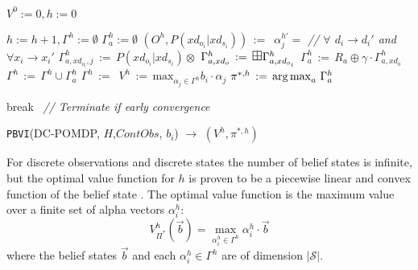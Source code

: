 \documentclass{article} %
\def\argmax{\operatornamewithlimits{arg\max}}
\begin{document}
\begin{algorithm}[t!]
\vspace{-.5mm}
\dontprintsemicolon
{}
\Begin
{
   $V^0:=0, h:=0$\;
   {
       $h:=h+1, \Gamma^h :=\emptyset$\;
       {
			$\Gamma_{a}^h :=\emptyset$ \;       		
       			{$(O^h,P(xd_{o_i}|xd_{s_i})) \,:=\,$ \;}
       		 {
       			{
   	 		  		$\alpha_j^{h'}=$  
   	 		  		\emph{// $\forall$ $d_i \to d_i'$ and $\forall x_i \to x_i'$} \; 
   	 		    	$\Gamma_{a,xd_{o_i},j}^h \,:=\, P(xd_{o_i}|xd_{s_i}) \otimes$ \;
       	      	}
       	      	$\Gamma_{a,xd_o}^h\,:=\,\textrm{\large $\boxplus$} \Gamma_{a,xd_{o_i}}^h$\;
       	     }
           $\Gamma_a^{h} \,:=\,R_a \oplus \gamma \cdot \Gamma_{a,xd_o}^h$\;
            $\Gamma^{h} \,:=\, \Gamma^{h} \cup \Gamma_a^{h}$\;
        }  
              $\Gamma^h \,:=\, $ \;
              $V^h \,:=\, \mathrm{max}_{\alpha_j \in \Gamma^h} b_i \cdot \alpha_j$\;
              $\pi^{*,h} \,:=\, \argmax_{a} \, \Gamma_a^{h}$\;

           {break $\,$ \emph{// Terminate if early convergence}\;}
   }
      \;
}
\caption{\footnotesize \texttt{PBVI}(DC-POMDP, $H$,$ContObs$, $b_i$) $\longrightarrow$ $(V^h,\pi^{*,h})$ \label{alg:vi}}
\vspace{-1mm}
\end{algorithm}
\decmargin{.5em}
For discrete observations and discrete states the number of belief states is infinite, but the optimal value function for $h$ is proven to be a piecewise linear and convex function of the belief state \cite{smallwoodSondik}. The optimal value function is the maximum value over a finite set of alpha vectors  $\alpha^h_i$:%
{\footnotesize
\begin{equation}
V^h_{\Pi^*}(\vec{b}) = \max_{\alpha^h_i \in \Gamma^h} \alpha^h_i \cdot \vec{b}
\end{equation}
}
where the belief states $\vec{b}$ and each $\alpha^h_i \in \Gamma^h$ are of dimension $|\mathcal{S}|$. 
\end{document}
